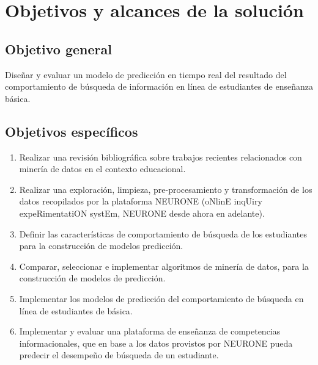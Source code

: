 \chapter{Objetivos y alcances de la solución}
\label{chp:objetivos}
\setcounter{page}{1}

\section{Objetivo general}
\label{sec:objetivo-general}
Diseñar y evaluar un modelo de predicción en tiempo real del resultado del comportamiento de búsqueda de información en línea de estudiantes de enseñanza básica.


\section{Objetivos específicos}
\label{sec:objetivo-especificos}

\begin{enumerate}
	\item Realizar una revisión bibliográfica sobre trabajos recientes relacionados con minería de datos en el contexto educacional.
	\item Realizar una exploración, limpieza, pre-procesamiento y transformación de los datos recopilados por la plataforma NEURONE (oNlinE inqUiry expeRimentatiON systEm, NEURONE desde ahora en adelante).
	\item Definir las características de comportamiento de búsqueda de los estudiantes para la construcción de modelos predicción.
	\item Comparar, seleccionar e implementar algoritmos de minería de datos, para la construcción de modelos de predicción.
	\item Implementar los modelos de predicción del comportamiento de búsqueda en línea de estudiantes de básica.
	\item Implementar y evaluar una plataforma de enseñanza de competencias informacionales, que en base a los datos provistos por NEURONE pueda predecir el desempeño de búsqueda de un estudiante.
\end{enumerate}